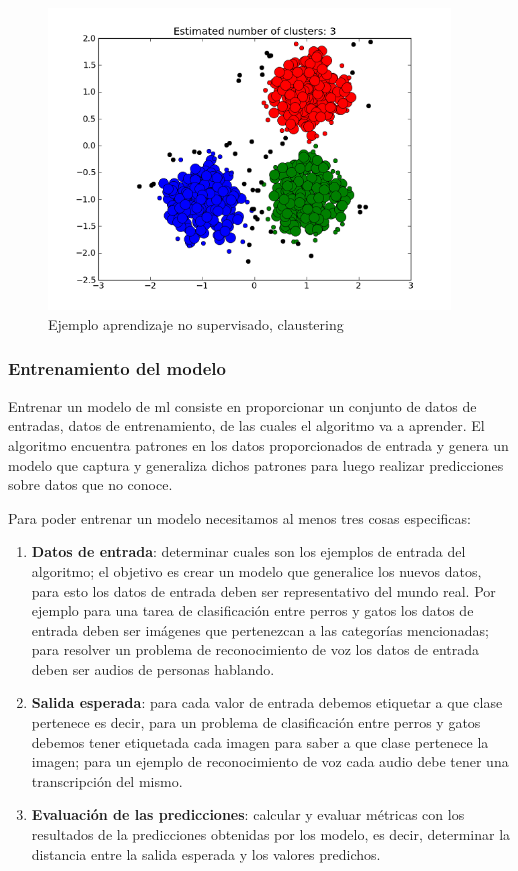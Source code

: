 \begin{figure}[H] \centering
  \includegraphics[height=8cm,keepaspectratio=true,clip=true]{imagenes/MarcoTeorico/claustering.png}
  \caption{Ejemplo aprendizaje no supervisado, claustering}\label{Fig:clauster}
\end{figure}


\subsubsection{Entrenamiento del modelo}
Entrenar un modelo de \ac{ml} consiste en proporcionar un conjunto de datos de entradas, datos de entrenamiento, de las cuales el algoritmo va a aprender. El algoritmo encuentra patrones en los datos proporcionados de entrada y genera un modelo que captura y generaliza dichos patrones para luego realizar predicciones sobre datos que no conoce.

Para poder entrenar un modelo necesitamos al menos tres cosas especificas:
\begin{enumerate}
\item \textbf{Datos de entrada}: determinar cuales son los ejemplos de entrada del algoritmo; el objetivo es crear un modelo que generalice los nuevos datos, para esto los datos de entrada deben ser representativo del mundo real. Por ejemplo para una tarea de clasificación entre perros y gatos los datos de entrada deben ser imágenes que pertenezcan a las categorías mencionadas; para resolver un problema de reconocimiento de voz los datos de entrada deben ser audios de personas hablando.

\item \textbf{Salida esperada}: para cada valor de entrada debemos etiquetar a que clase pertenece es decir, para un problema de clasificación entre perros y gatos debemos tener etiquetada cada imagen para saber a que clase pertenece la imagen; para un ejemplo de reconocimiento de voz cada audio debe tener una transcripción del mismo.

\item \textbf{Evaluación de las predicciones}: calcular y evaluar métricas con los resultados de la predicciones obtenidas por los modelo, es decir, determinar la distancia entre la salida esperada y los valores predichos.
\end{enumerate}

